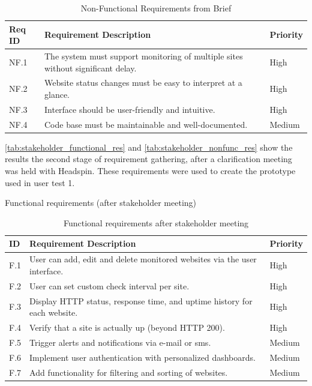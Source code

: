 \begin{table}[H]
    \centering
    \caption{Non-Functional Requirements from Brief}
    \label{tab:non_functional_reqs_brief-res}
    \begin{tabular}{| l  |p{}  |l |} 
        \hline
        \textbf{Req ID} & \textbf{Requirement Description} & \textbf{Priority} \\
        \hline
        NF.1 & The system must support monitoring of multiple sites without significant delay.& High \\ \hline 
        NF.2 & Website status changes must be easy to interpret at a glance.& High \\ \hline 
        NF.3 & Interface should be user-friendly and intuitive.& High \\ \hline 
        NF.4 & Code base must be maintainable and well-documented.& Medium \\ \hline
    \end{tabular}
\end{table}

\autoref{tab:stakeholder_functional_res} and \autoref{tab:stakeholder_nonfunc_res} show the results the second stage of requirement gathering, after a clarification meeting was held with Headspin. These requirements were used to create the prototype used in user test 1.
\begin{table}[H]
\centering
\caption{Functional requirements (after stakeholder meeting)}
\label{tab:stakeholder_functional_res}
\begin{tabular}{| l  |p{}  |l |} 
\hline
\textbf{ID} & \textbf{Requirement Description}& \textbf{Priority} \\ \hline
F.1 & User can add, edit and delete monitored websites via the user interface.& High \\ \hline
F.2 & User can set custom check interval per site.& High \\ \hline
F.3 & Display HTTP status, response time, and uptime history for each website.& High \\ \hline
F.4 & Verify that a site is actually up (beyond HTTP 200). & High \\ \hline 
F.5 & Trigger alerts and notifications via e-mail or sms.&Medium \\ \hline
F.6 & Implement user authentication with personalized dashboards.& Medium\\ \hline
F.7 & Add functionality for filtering and sorting of websites.& Medium \\ \hline
\end{tabular}
\caption{Functional requirements after stakeholder meeting}
\label{tab:functional_req_stakeholder}
\end{table}


